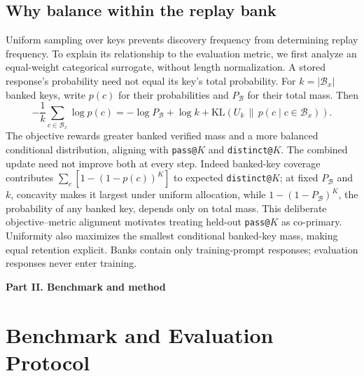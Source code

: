 \documentclass{article}
\newcommand{\1}{\mathbf 1}
\theoremstyle{remark}
\theoremstyle{definition}
\theoremstyle{plain}
\begin{document}
\subsection{Why balance within the replay bank}
\label{app:replay-metric-alignment}

Uniform sampling over keys prevents discovery frequency from determining replay
frequency. To explain its relationship to the evaluation metric, we first
analyze an equal-weight categorical surrogate, without length normalization.
A stored response's probability need not equal its key's total probability.
For $k=|\mathcal B_x|$ banked keys, write $p(c)$ for their probabilities and
$P_{\mathcal B}$ for their total mass. Then
\begin{equation}
 -\frac1k\sum_{c\in\mathcal B_x}\log p(c)
 =-\log P_{\mathcal B}+\log k+
   \mathrm{KL}\!\left(U_k\,\|\,
   p(c\mid c\in\mathcal B_x)\right).
 \label{eq:replay-bank-decomposition}
\end{equation}
The objective rewards greater banked verified mass and a more balanced
conditional distribution, aligning with \texttt{pass@}$K$ and
\texttt{distinct@}$K$. The combined update need not improve both at every step. Indeed banked-key coverage contributes
$\sum_c[1-(1-p(c))^K]$ to expected \texttt{distinct@}$K$; at fixed
$P_{\mathcal B}$ and $k$, concavity makes it largest under uniform allocation,
while $1-(1-P_{\mathcal B})^K$, the probability of any banked key, depends
only on total mass. This deliberate objective--metric alignment motivates
treating held-out \texttt{pass@}$K$ as co-primary. Uniformity also maximizes the
smallest conditional banked-key mass, making equal retention explicit. Banks
contain only training-prompt responses; evaluation responses never enter
training.




\clearpage
{}
\begin{center}\large\textbf{Part II. Benchmark and method}\end{center}

\section{Benchmark and Evaluation Protocol}
\label{app:data}
\label{app:experimental-design}
\label{app:domain-overview}
\label{app:data-inventory}
\end{document}
